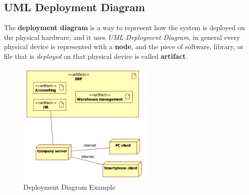 \documentclass[12pt]{article}
\begin{document}
\subsection{UML Deployment Diagram}
The \textbf{deployment diagram} is a way to represent how the system is deployed on the physical hardware, and it uses \emph{UML Deployment Diagram}, in general every physical device is represented with a \textbf{node}, and the piece of software, library, or file that is \emph{deployed} on that physical device is called \textbf{artifact}.
\begin{figure}[H]
  \centering
  \includegraphics[width=0.6\textwidth]{deplyment-diagram-example.png}
  \caption{Deployment Diagram Example}
  \label{fig:deplyment-diagram-example}
\end{figure}
\end{document}
